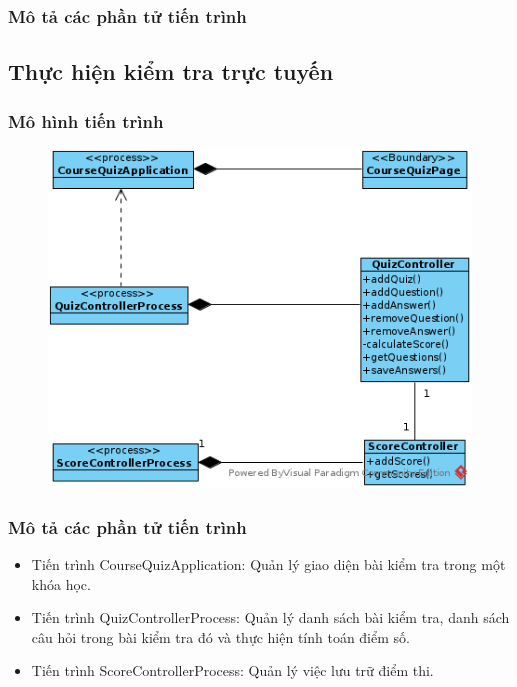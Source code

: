 \documentclass[./../main_file.tex]{subfiles}
\begin{document}
\subsubsection{Mô tả các phần tử tiến trình}

\subsection{Thực hiện kiểm tra trực tuyến}

\subsubsection{Mô hình tiến trình}

\begin{figure}[H]
	\centering
	\includegraphics[width=\linewidth]{./images/pv_take_test.png}
\end{figure}

\subsubsection{Mô tả các phần tử tiến trình}
\begin{itemize}
	\item Tiến trình CourseQuizApplication: Quản lý giao diện bài kiểm tra trong một khóa học.
	\item Tiến trình QuizControllerProcess: Quản lý danh sách bài kiểm tra, danh sách câu hỏi trong bài kiểm tra đó và thực hiện tính toán điểm số.
	\item Tiến trình ScoreControllerProcess: Quản lý việc lưu trữ điểm thi.
	
\end{itemize}
\end{document}
